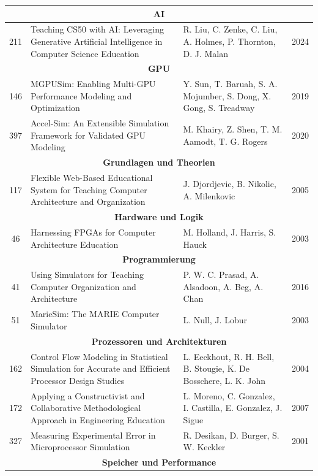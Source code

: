 {\begin{longtable}{|c|p{6cm}|p{3cm}|c|}
    \multicolumn{4}{c}{\textbf{AI}} \\
    \hline
    211 & Teaching CS50 with AI: Leveraging Generative Artificial Intelligence in Computer Science Education & R. Liu, C. Zenke, C. Liu, A. Holmes, P. Thornton, D. J. Malan & 2024 \\
    \hline
    \multicolumn{4}{c}{\textbf{GPU}} \\
    \hline
    146 & MGPUSim: Enabling Multi-GPU Performance Modeling and Optimization & Y. Sun, T. Baruah, S. A. Mojumber, S. Dong, X. Gong, S. Treadway & 2019 \\
    397 & Accel-Sim: An Extensible Simulation Framework for Validated GPU Modeling & M. Khairy, Z. Shen, T. M. Aamodt, T. G. Rogers & 2020 \\
    \hline
    \multicolumn{4}{c}{\textbf{Grundlagen und Theorien}} \\
    \hline
    117 & Flexible Web-Based Educational System for Teaching Computer Architecture and Organization & J. Djordjevic, B. Nikolic, A. Milenkovic & 2005 \\
    \hline
    \multicolumn{4}{c}{\textbf{Hardware und Logik}} \\
    \hline
    46 & Harnessing FPGAs for Computer Architecture Education & M. Holland, J. Harris, S. Hauck & 2003 \\
    \hline
    \multicolumn{4}{c}{\textbf{Programmierung}} \\
    \hline
    41 & Using Simulators for Teaching Computer Organization and Architecture & P. W. C. Prasad, A. Alsadoon, A. Beg, A. Chan & 2016 \\
    51 & MarieSim: The MARIE Computer Simulator & L. Null, J. Lobur & 2003 \\
    \hline
    \multicolumn{4}{c}{\textbf{Prozessoren und Architekturen}} \\
    \hline
    162 & Control Flow Modeling in Statistical Simulation for Accurate and Efficient Processor Design Studies & L. Eeckhout, R. H. Bell, B. Stougie, K. De Bosschere, L. K. John & 2004 \\
    172 & Applying a Constructivist and Collaborative Methodological Approach in Engineering Education & L. Moreno, C. Gonzalez, I. Castilla, E. Gonzalez, J. Sigue & 2007 \\
    327 & Measuring Experimental Error in Microprocessor Simulation & R. Desikan, D. Burger, S. W. Keckler & 2001 \\
    \hline
    \multicolumn{4}{c}{\textbf{Speicher und Performance}} \\

\end{longtable}}
